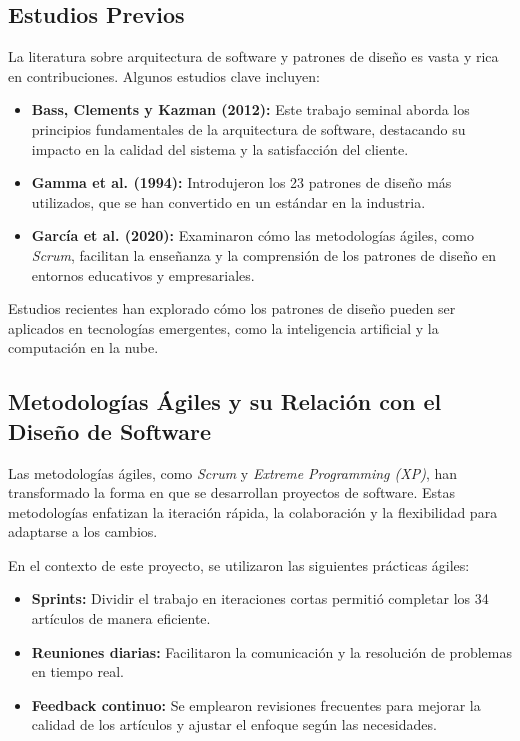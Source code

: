 \documentclass[12pt, a4paper]{article}
\begin{document}
\subsection{Estudios Previos}
La literatura sobre arquitectura de software y patrones de diseño es vasta y rica en contribuciones. Algunos estudios clave incluyen:
\begin{itemize}
    \item \textbf{Bass, Clements y Kazman (2012):} Este trabajo seminal aborda los principios fundamentales de la arquitectura de software, destacando su impacto en la calidad del sistema y la satisfacción del cliente.
    \item \textbf{Gamma et al. (1994):} Introdujeron los 23 patrones de diseño más utilizados, que se han convertido en un estándar en la industria.
    \item \textbf{García et al. (2020):} Examinaron cómo las metodologías ágiles, como \textit{Scrum}, facilitan la enseñanza y la comprensión de los patrones de diseño en entornos educativos y empresariales.
\end{itemize}

Estudios recientes han explorado cómo los patrones de diseño pueden ser aplicados en tecnologías emergentes, como la inteligencia artificial y la computación en la nube.

\subsection{Metodologías Ágiles y su Relación con el Diseño de Software}
Las metodologías ágiles, como \textit{Scrum} y \textit{Extreme Programming (XP)}, han transformado la forma en que se desarrollan proyectos de software. Estas metodologías enfatizan la iteración rápida, la colaboración y la flexibilidad para adaptarse a los cambios.

En el contexto de este proyecto, se utilizaron las siguientes prácticas ágiles:
\begin{itemize}
    \item \textbf{Sprints:} Dividir el trabajo en iteraciones cortas permitió completar los 34 artículos de manera eficiente.
    \item \textbf{Reuniones diarias:} Facilitaron la comunicación y la resolución de problemas en tiempo real.
    \item \textbf{Feedback continuo:} Se emplearon revisiones frecuentes para mejorar la calidad de los artículos y ajustar el enfoque según las necesidades.
\end{itemize}
\end{document}
